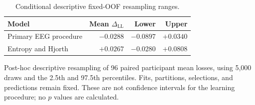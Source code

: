 \begin{table}[!htbp]
\centering\small
\caption{Conditional descriptive fixed-OOF resampling ranges.}
\label{tab:fixed-oof}
\setlength{\tabcolsep}{4pt}\renewcommand{\arraystretch}{1.14}
\begin{tabularx}{\textwidth}{@{}>{\raggedright\arraybackslash}Xrrr@{}}
\toprule
Model & Mean $\Delta_{\mathrm{LL}}$ & Lower & Upper\\\midrule
Primary EEG procedure & $-0.0288$ & $-0.0897$ & $+0.0340$\\
Entropy and Hjorth & $+0.0267$ & $-0.0280$ & $+0.0808$\\
\bottomrule\end{tabularx}
\par\smallskip\begin{minipage}{\textwidth}\footnotesize Post-hoc descriptive resampling of 96 paired participant mean losses, using 5,000 draws and the 2.5th and 97.5th percentiles. Fits, partitions, selections, and predictions remain fixed. These are not confidence intervals for the learning procedure; no $p$ values are calculated.\end{minipage}
\end{table}

